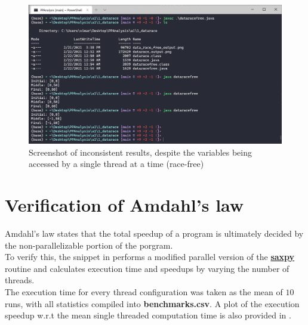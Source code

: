 \documentclass{article}
\begin{document}
      
      
      \begin{figure}[h]
        \centering
        \includegraphics[scale=0.7]{1_datarace/dataracefree_output.png}
        \caption{Screenshot of inconsistent results, despite the variables being accessed by a single thread at a time (race-free)}
        \label{fig::12}
      \end{figure}
      
  \clearpage
  \section{Verification of Amdahl's law}
    Amdahl's law states that the total speedup of a program is ultimately decided by the non-parallelizable portion of the porgram. \\
    To verify this, the snippet in  performs a modified parallel version of the \href{https://developer.nvidia.com/blog/six-ways-saxpy/}{\textbf{saxpy}} routine and calculates execution time and speedups by varying the number of threads.\\
    The execution time for every thread configuration was taken as the mean of $10$ runs, with all statistics compiled into \textbf{benchmarks.csv}. A plot of the execution speedup w.r.t the mean single threaded computation time is also provided in .

    
\end{document}
